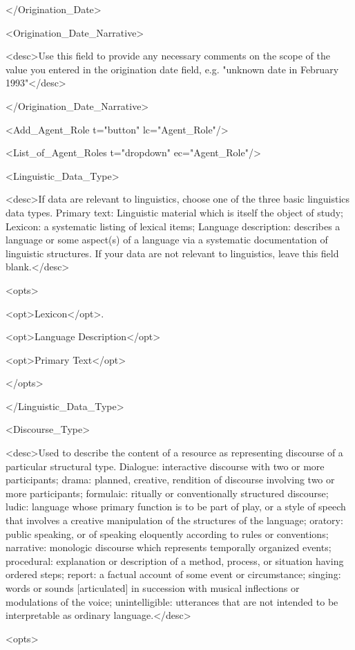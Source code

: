 </Origination_Date>

<Origination_Date_Narrative>

<desc>Use this field to provide any necessary comments on the scope of the value you entered in the origination date field, e.g. "unknown date in February 1993"</desc>

</Origination_Date_Narrative>

<Add_Agent_Role t="button" lc="Agent_Role"/>

<List_of_Agent_Roles t="dropdown" ec="Agent_Role"/>

<Linguistic_Data_Type>

<desc>If data are relevant to linguistics, choose one of the three basic linguistics data types. Primary text: Linguistic material which is itself the object of study; Lexicon: a systematic listing of lexical items; Language description: describes a language or some aspect(s) of a language via a systematic documentation of linguistic structures. If your data are not relevant to linguistics, leave this field blank.</desc>

<opts>

<opt>Lexicon</opt>.

<opt>Language Description</opt>

<opt>Primary Text</opt>

</opts>

</Linguistic_Data_Type>

<Discourse_Type>

<desc>Used to describe the content of a resource as representing discourse of a particular structural type. Dialogue: interactive discourse with two or more participants; drama: planned, creative, rendition of discourse involving two or more participants; formulaic: ritually or conventionally structured discourse; ludic: language whose primary function is to be part of play, or a style of speech that involves a creative manipulation of the structures of the language; oratory: public speaking, or of speaking eloquently according to rules or conventions; narrative: monologic discourse which represents temporally organized events; procedural: explanation or description of a method, process, or situation having ordered steps; report: a factual account of some event or circumstance; singing: words or sounds {[}articulated{]} in succession with musical inflections or modulations of the voice; unintelligible: utterances that are not intended to be interpretable as ordinary language.</desc>

<opts>

